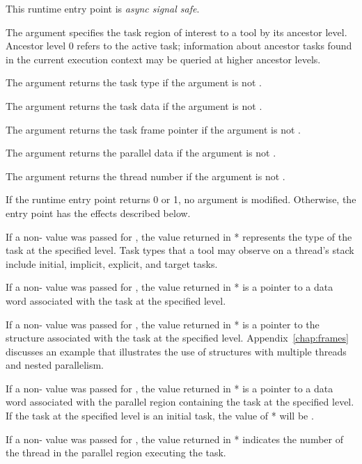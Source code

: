 This runtime entry point is \emph{async signal safe}.

\argdesc

The argument  specifies the task region
of interest to a tool by its ancestor level.  Ancestor level 0 refers
to the active task; information about
ancestor tasks found in the current execution context may be queried at
higher ancestor levels.

The argument  returns the task type
if the argument is not .

The argument  returns the task data
if the argument is not .

The argument  returns the task frame
pointer
if the argument is not .

The argument  returns the parallel data
if the argument is not .

The argument  returns the thread number
if the argument is not .

\effect


If the runtime entry point returns 0 or 1, no argument is modified.
Otherwise, the entry point has the effects described below.

If a non- value was passed for ,
the value returned in * represents the type of the task
at the specified level.
Task types that a tool may observe on a thread's stack include
initial, implicit, explicit, and target tasks.

If a non- value was passed for ,
the value returned in * is a pointer to a data word
associated with the task at the specified level.

If a non- value was passed for ,
the value returned in * is a pointer to the
 structure associated with the task at the specified level.
Appendix~\ref{chap:frames} discusses an example that
illustrates the use of  structures with multiple
threads and nested parallelism.

If a non- value was passed for ,
the value returned in * is a pointer to a data word
associated with the parallel region containing the task at the specified level.
If the task at the specified level is an initial task,
the value of * will be .

If a non- value was passed for ,
the value returned in *
indicates the number of the thread in the parallel region executing the task.

